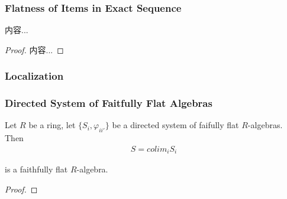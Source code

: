 \documentclass[Total.tex]{subfiles}
\begin{document}
				\subsubsection{Flatness of Items in Exact Sequence}
				\begin{lemma}
					内容...
				\end{lemma}
				\begin{proof}
					内容...
				\end{proof}
				\subsubsection{Localization}
				\subsubsection{Directed System of Faitfully Flat Algebras}	
				\begin{proposition}
					Let $R$ be a ring, let $\{S_i,\varphi_{ii'}\}$ be a directed system of faifully flat $R$-algebras. Then
					\begin{gather*}
						S=colim_i S_i
					\end{gather*}
					
					is a faithfully flat $R$-algebra.
				\end{proposition}
				\begin{proof}
					
				\end{proof}
\end{document}
